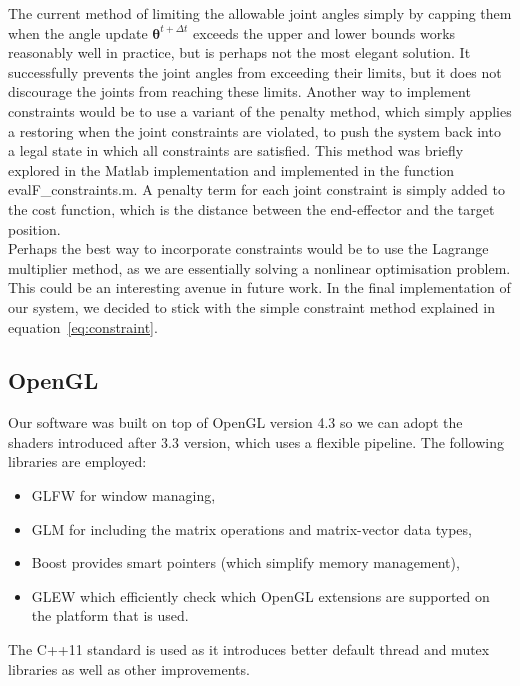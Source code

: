 \documentclass[paper=a4, fontsize=11pt]{scrartcl} %
\numberwithin{equation}{section} %
\numberwithin{figure}{section} %
\numberwithin{table}{section} %
\newcommand{\params}{\boldsymbol{\theta}}
\begin{document}
The current method of limiting the allowable joint angles simply by capping them when the angle update $\params^{t+\Delta t}$ exceeds the upper and lower bounds works reasonably well in practice, but is perhaps not the most elegant solution. It successfully prevents the joint angles from exceeding their limits, but it does not discourage the joints from reaching these limits. Another way to implement constraints would be to use a variant of the penalty method, which simply applies a restoring when the joint constraints are violated, to push the system back into a legal state in which all constraints are satisfied. This method was briefly explored in the Matlab implementation and implemented in the function evalF\_constraints.m. A penalty term for each joint constraint is simply added to the cost function, which is the distance between the end-effector and the target position. \\

Perhaps the best way to incorporate constraints would be to use the Lagrange multiplier method, as we are essentially solving a nonlinear optimisation problem. This could be an interesting avenue in future work. In the final implementation of our system, we decided to stick with the simple constraint method explained in equation~\ref{eq:constraint}.

\subsection{ OpenGL}

% 
Our software was built on top of OpenGL version 4.3 so we can adopt the shaders introduced after 3.3 version, which uses a flexible pipeline. The following libraries are employed: 
\begin{itemize}
\item GLFW for window managing, 
\item GLM  for including the matrix operations and matrix-vector data types, 
\item Boost provides smart pointers (which simplify memory management), 
\item GLEW which efficiently check which OpenGL extensions are supported on the platform that is used. 
\end{itemize}
The C++11 standard is used as it introduces better default thread and mutex libraries as well as other improvements. \\
\end{document}
